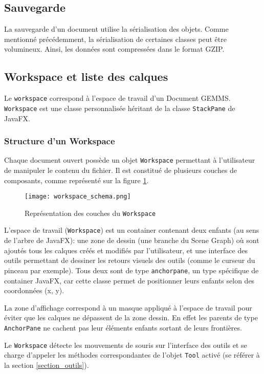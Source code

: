 \subsection{Sauvegarde}
La sauvegarde d'un document utilise la sérialisation des objets. Comme mentionné précédemment, la sérialisation de certaines classes peut être volumineux. Ainsi, les données sont compressées dans le format GZIP.

\subsection{Workspace et liste des calques}
Le \texttt{\gls{workspace}} correspond à l'espace de travail d'un Document GEMMS. \texttt{Workspace} est une classe personnalisée héritant de la classe \texttt{StackPane} de JavaFX. 

\subsubsection{Structure d'un Workspace}
Chaque document ouvert possède un objet \texttt{Workspace} permettant à l'utilisateur de manipuler le contenu du fichier. Il est constitué de plusieurs couches de composants, comme représenté sur la figure \ref{fig:workspace_representation}.


\begin{figure}[H]
	\caption{Représentation des couches du \texttt{Workspace}}
	\centering
	\texttt{[image: workspace\_schema.png]}
	\label{fig:workspace_representation}
\end{figure}

L'espace de travail (\texttt{Workspace}) est un container contenant deux enfants (au sens de l'arbre de JavaFX): une zone de dessin (une branche du Scene Graph) où sont ajoutés tous les calques créés et modifiés par l'utilisateur, et une interface des outils permettant de dessiner les retours visuels des outils (comme le curseur du pinceau par exemple). Tous deux sont de type \texttt{\gls{anchorpane}}, un type spécifique de container JavaFX, car cette classe permet de positionner leurs enfants selon des coordonnées (x, y).

La zone d'affichage correspond à un masque appliqué à l'espace de travail pour éviter que les calques ne dépassent de la zone dessin. En effet les parents de type \texttt{AnchorPane} ne cachent pas leur éléments enfants sortant de leurs frontières.

Le \texttt{Workspace} détecte les mouvements de souris sur l'interface des outils et se charge d'appeler les méthodes correspondantes de l'objet \texttt{Tool} activé (se référer à la section \ref{section_outils}).

